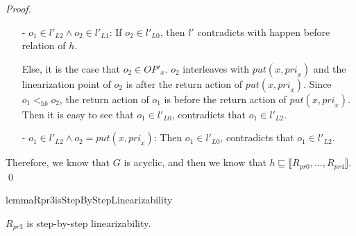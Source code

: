 \documentclass{llncs}
\begin{document}
\begin {proof}
\begin{itemize}
\item[-] $o_1 \in l'_{L2} \wedge o_2 \in l'_{L1}$: If $o_2 \in l'_{L0}$, then $l'$ contradicts with happen before relation of $h$.

    Else, it is the case that $o_2 \in \textit{OP}'_x$. $o_2$ interleaves with $\textit{put}(x,\textit{pri}_x)$ and the linearization point of $o_2$ is after the return action of $\textit{put}(x,\textit{pri}_x)$. Since $o_1 <_{\textit{hb}} o_2$, the return action of $o_1$ is before the return action of $\textit{put}(x,\textit{pri}_x)$. Then it is easy to see that $o_1 \in l'_{L0}$, contradicts that $o_1 \in l'_{L2}$.

\item[-] $o_1 \in l'_{L2} \wedge o_2 = \textit{put}(x,\textit{pri}_x)$: Then $o_1 \in l'_{L0}$, contradicts that $o_1 \in l'_{L2}$.
\end{itemize}

Therefore, we know that $G$ is acyclic, and then we know that $h \sqsubseteq \llbracket R_{\textit{pr0}},\ldots,R_{\textit{pr4}} \rrbracket$. \qed
\end {proof}



\begin{restatable}{lemma}{Rpr3isStepByStepLinearizability}
\label{lemma:Rpr3 is step-by-step linearizability}

$R_{\textit{pr3}}$ is step-by-step linearizability.

\end{restatable}
\end{document}
